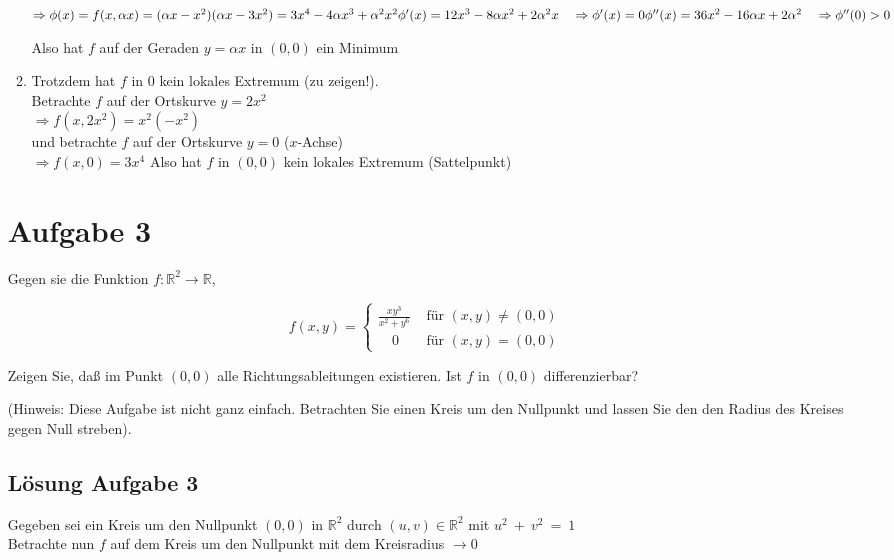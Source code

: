 \documentclass[ngerman, a4paper]{scrartcl}
\begin{document}
\begin{enumerate}[\textbf{\alph*)}]
\begin{enumerate}[\textbf{\alph*)}]
			$
			\Rightarrow \phi(x) = f(x, \alpha x) = (\alpha x-x^2)(\alpha x - 3x^2) = 3x^4 - 4\alpha x^3 + \alpha^2 x^2\\
			\phi'(x) = 12x^3 - 8\alpha x^2 + 2\alpha^2x \quad \Rightarrow \phi^\prime(x) = 0\\
			\phi''(x) = 36x^2 - 16\alpha x + 2\alpha^2 \quad \Rightarrow \phi''(0) > 0
			$
			
			Also hat $f$ auf der Geraden $y = \alpha x $ in $(0,0)$ ein Minimum
			
			\item Trotzdem hat $f$ in 0 kein lokales Extremum (zu zeigen!).\\
			Betrachte $f$ auf der Ortskurve $y = 2x^2$
			\\
			
			$\Rightarrow f(x, 2x^2) = x^2(-x^2)$
			\\
			
			und betrachte $f$ auf der Ortskurve $y = 0$ ($x$-Achse) 
			\\
			
			$\Rightarrow f(x, 0) = 3x^4$
			Also hat $f$ in $(0,0)$ kein lokales Extremum (Sattelpunkt)
		\end{enumerate}
	
		\section*{Aufgabe 3}
		Gegen sie die Funktion $f: \mathbb{R}^2 \rightarrow \mathbb{R}$,
		
		\[
			f(x,y) = 
			\begin{cases}
				\tfrac{xy^3}{x^2 + y^6} &\text{ für } (x,y) \ne (0,0)\\
				\quad 0 &\text{ für } (x,y) = (0,0)
			\end{cases}
		\]
		
		Zeigen Sie, daß im Punkt $(0,0)$ alle Richtungsableitungen existieren.
		Ist $f$ in $(0,0)$ differenzierbar?
		
		(Hinweis: Diese Aufgabe ist nicht ganz einfach. Betrachten Sie einen Kreis um den Nullpunkt und lassen Sie den den Radius des Kreises gegen Null  streben).
		
		\subsection*{Lösung Aufgabe 3}
		
		Gegeben sei ein Kreis um den Nullpunkt $(0,0)$ in $\mathbb{R}^2$ durch $(u,v)\in \mathbb{R}^2$ mit $u^2~+~v^2~=~1$ \\
		Betrachte nun $f$ auf dem Kreis um den Nullpunkt mit dem Kreisradius $\rightarrow 0$
		

\end{enumerate}
\end{document}
